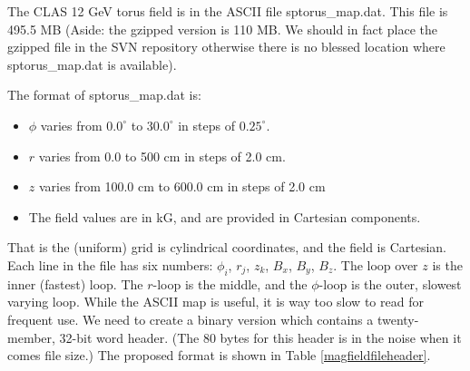 The CLAS 12 GeV torus field is in the ASCII file sptorus\_map.dat. This file is 495.5 MB (Aside: the gzipped version is 110 MB. 
We should in fact place the gzipped file in the SVN repository otherwise there is no blessed location where sptorus\_map.dat is available).

The format of sptorus\_map.dat is: 

\begin{itemize}
    \item $\phi$ varies from $0.0^\circ$ to $30.0^\circ$ in steps of $0.25^\circ$.
    \item $r$ varies from 0.0 to 500 cm in steps of 2.0 cm.
    \item $z$ varies from 100.0 cm to 600.0 cm in steps of 2.0 cm
    \item The field values are in kG, and are provided in Cartesian components.
\end{itemize}
 

That is the (uniform) grid is cylindrical coordinates, and the field is Cartesian. 
Each line in the file has six numbers: $\phi_i$, $r_j$, $z_k$, $B_x$, $B_y$, $B_z$. 
The loop over $z$ is the inner (fastest) loop. 
The $r$-loop is the middle, and the $\phi$-loop is the outer, slowest varying loop. 
While the ASCII map is useful, it is way too slow to read for frequent use. We need to create a binary version
which contains a twenty-member, 32-bit word header. (The 80 bytes for this header is in the noise when it comes file size.) The proposed format is
shown in Table \ref{magfieldfileheader}.

